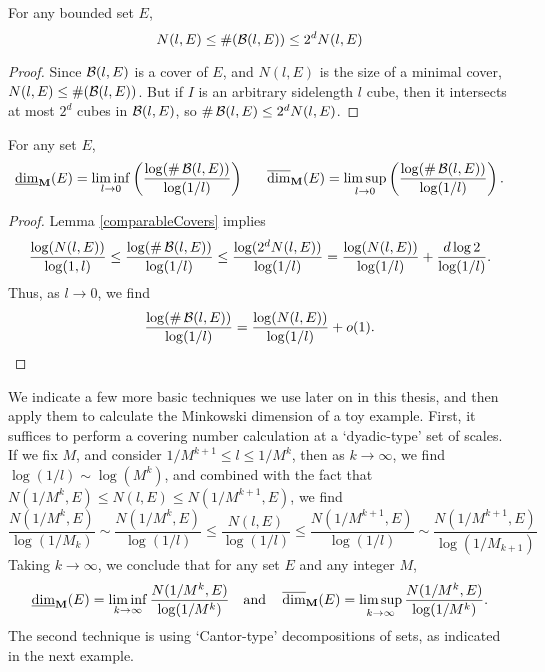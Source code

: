 \begin{lemma} \label{comparableCovers}
	For any bounded set $E$,
	\[ N(l,E) \leq \#(\operatorname{\mathcal{B}}(l,E)) \leq 2^d N(l,E) \]
\end{lemma}
\begin{proof}
	Since $\operatorname{\mathcal{B}}(l,E)$ is a cover of $E$, and $N(l,E)$ is the size of a minimal cover, $N(l,E) \leq \#(\operatorname{\mathcal{B}}(l,E))$. But if $I$ is an arbitrary sidelength $l$ cube, then it intersects at most $2^d$ cubes in $\operatorname{\mathcal{B}}(l,E)$, so $\# \operatorname{\mathcal{B}}(l,E) \leq 2^d N(l,E)$.
\end{proof}

\begin{corollary}
	For any set $E$,
	\[ \operatorname{\underline{\dim}_{\mathbf{M}}}(E) = \liminf_{l \to 0} \left( \frac{\log(\# \operatorname{\mathcal{B}}(l,E))}{\log(1/l)} \right)\ \ \ \ \ \operatorname{\overline{\dim}_{\mathbf{M}}}(E) = \limsup_{l \to 0} \left( \frac{\log(\# \operatorname{\mathcal{B}}(l,E))}{\log(1/l)} \right). \]
\end{corollary}
\begin{proof}
	Lemma \ref{comparableCovers} implies
	\[ \frac{\log(N(l,E))}{\log(1,l)} \leq \frac{\log(\# \operatorname{\mathcal{B}}(l,E))}{\log(1/l)} \leq \frac{\log(2^d N(l,E))}{\log(1/l)} = \frac{\log(N(l,E))}{\log(1/l)} + \frac{d \log 2}{\log(1/l)}. \]
	Thus, as $l \to 0$, we find
	\[ \frac{\log(\# \operatorname{\mathcal{B}}(l,E))}{\log(1/l)} = \frac{\log(N(l,E))}{\log(1/l)} + o(1). \qedhere \]
\end{proof}

%


We indicate a few more basic techniques we use later on in this thesis, and then apply them to calculate the Minkowski dimension of a toy example. First, it suffices to perform a covering number calculation at a `dyadic-type' set of scales. If we fix $M$, and consider $1/M^{k+1} \leq l \leq 1/M^k$, then as $k \to \infty$, we find $\log(1/l) \sim \log(M^k)$, and combined with the fact that $N(1/M^k, E) \leq N(l,E) \leq N(1/M^{k+1}, E)$, we find
%
\[ \frac{N(1/M^k,E)}{\log(1/M_k)} \sim \frac{N(1/M^k,E)}{\log(1/l)} \leq \frac{N(l,E)}{\log(1/l)} \leq \frac{N(1/M^{k+1},E)}{\log(1/l)} \sim \frac{N(1/M^{k+1},E)}{\log(1/M_{k+1})} \]
%
Taking $k \to \infty$, we conclude that for any set $E$ and any integer $M$,
%
\[ \operatorname{\underline{\dim}_{\mathbf{M}}}(E) = \liminf_{k \to \infty} \frac{N(1/M^k,E)}{\log(1/M^k)}\quad\text{and}\quad \operatorname{\overline{\dim}_{\mathbf{M}}}(E) = \limsup_{k \to \infty} \frac{N(1/M^k,E)}{\log(1/M^k)}. \]
%
The second technique is using `Cantor-type' decompositions of sets, as indicated in the next example.


